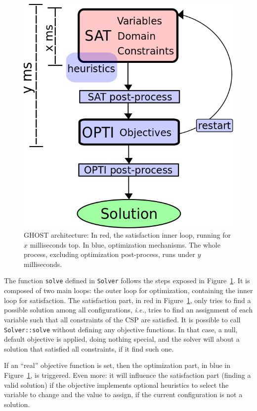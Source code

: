 \documentclass[journal]{IEEEtran}
\newcommand{\csp}{\textsc{CSP}\xspace}
\newcommand{\ghost}{\textsc{GHOST}\xspace}
\newcommand{\ie}{\textit{i.e.}}
\begin{document}
\begin{figure}[th]
  \centering
  \includegraphics[width=\columnwidth]{figs/archi2.png}
  \caption{\ghost architecture: In red, the satisfaction inner
    loop,  running  for  $x$  milliseconds top.  In  blue,  optimization
    mechanisms.    The   whole    process,   excluding    optimization
    post-process, runs under $y$ milliseconds.}
  \label{fig:archi}
\end{figure}

The  function \texttt{solve}  defined in  \texttt{Solver} follows  the
steps exposed  in Figure~\ref{fig:archi}. It  is composed of  two main
loops: the outer loop for  optimization, containing the inner loop for
satisfaction.      The     satisfaction     part,    in     red     in
Figure~\ref{fig:archi}, only  tries to find a  possible solution among
all configurations, \ie, tries to  find an assignment of each variable
such that all constraints of the \csp are satisfied. It is possible to
call \texttt{Solver::solve} without  defining any objective functions.
In  that case,  a null,  default objective  is applied,  doing nothing
special,  and the  solver will  about  a solution  that satisfied  all
constraints, if it find such one.

If an ``real'' objective function  is set, then the optimization part,
in blue  in Figure~\ref{fig:archi}, is  triggered. Even more:  it will
influence  the satisfaction  part (finding  a valid  solution) if  the
objective  implements optional  heuristics to  select the  variable to
change and the value to assign,  if the current configuration is not a
solution.
\end{document}
